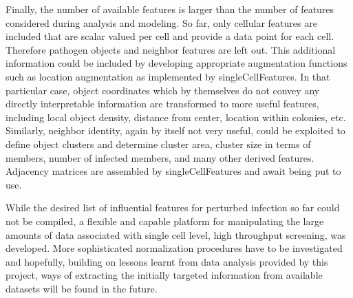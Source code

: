 Finally, the number of available features is larger than the number of features considered during analysis and modeling. So far, only cellular features are included that are scalar valued per cell and provide a data point for each cell. Therefore pathogen objects and neighbor features are left out. This additional information could be included by developing appropriate augmentation functions such as location augmentation as implemented by singleCellFeatures. In that particular case, object coordinates which by themselves do not convey any directly interpretable information are transformed to more useful features, including local object density, distance from center, location within colonies, etc. Similarly, neighbor identity, again by itself not very useful, could be exploited to define object clusters and determine cluster area, cluster size in terms of members, number of infected members, and many other derived features. Adjacency matrices are assembled by singleCellFeatures and await being put to use.

While the desired list of influential features for  perturbed infection so far could not be compiled, a flexible and capable platform for manipulating the large amounts of data associated with single cell level, high throughput screening, was developed. More sophisticated normalization procedures have to be investigated and hopefully, building on lessons learnt from data analysis provided by this project, ways of extracting the initially targeted information from available datasets will be found in the future.
